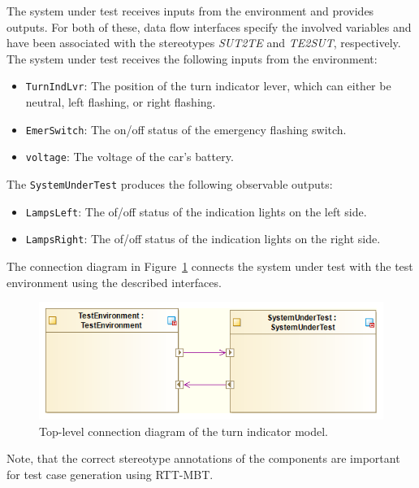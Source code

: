 The system under test receives inputs from the environment and provides outputs.
For both of these, data flow interfaces specify the involved variables
and have been associated with the stereotypes \emph{SUT2TE} and \emph{TE2SUT},
respectively.
The system under test receives the following inputs from the environment:
\begin{itemize}
    \item \texttt{TurnIndLvr}: The position of the turn indicator lever, which can either be
      neutral, left flashing, or right flashing.
    \item \texttt{EmerSwitch}: The on/off status of the emergency flashing switch.
    \item \texttt{voltage}: The voltage of the car's battery.
\end{itemize}
The \texttt{SystemUnderTest} produces the following observable outputs:
\begin{itemize}
    \item \texttt{LampsLeft}: The of/off status of the indication lights on the left side.
    \item \texttt{LampsRight}: The of/off status of the indication lights on the right side.
\end{itemize}
The connection diagram in Figure~\ref{figure:turnindicator:toplevel-connections} connects
the system under test with the test environment using the described interfaces.
\begin{figure}[hpt!]
    \centerline{\includegraphics[scale=0.5]{turnindicator/VSI-modelio_turn_indication_small_toplevel_connection_diagram}}
    \caption{Top-level connection diagram of the turn indicator model.}
    \label{figure:turnindicator:toplevel-connections}
\end{figure}

Note, that the correct stereotype annotations of the components are
important for test case generation using RTT-MBT.

